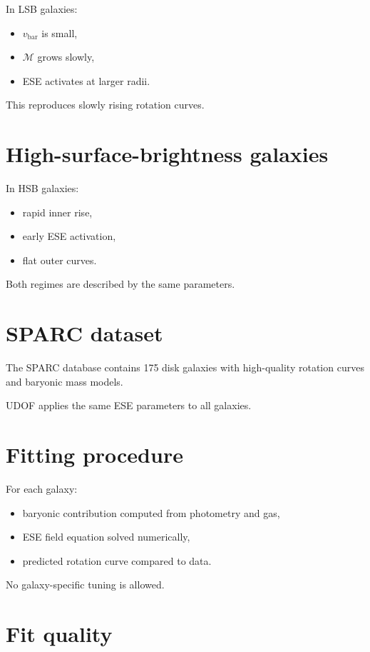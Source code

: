 \documentclass[11pt]{book}
\begin{document}
In LSB galaxies:
\begin{itemize}
\item $v_{\mathrm{bar}}$ is small,
\item $\mathcal{M}$ grows slowly,
\item ESE activates at larger radii.
\end{itemize}

This reproduces slowly rising rotation curves.

\section{High-surface-brightness galaxies}

In HSB galaxies:
\begin{itemize}
\item rapid inner rise,
\item early ESE activation,
\item flat outer curves.
\end{itemize}

Both regimes are described by the same parameters.

\section{SPARC dataset}

The SPARC database contains 175 disk galaxies with high-quality rotation
curves and baryonic mass models.

UDOF applies the same ESE parameters to all galaxies.

\section{Fitting procedure}

For each galaxy:
\begin{itemize}
\item baryonic contribution computed from photometry and gas,
\item ESE field equation solved numerically,
\item predicted rotation curve compared to data.
\end{itemize}

No galaxy-specific tuning is allowed.

\section{Fit quality}
\end{document}
